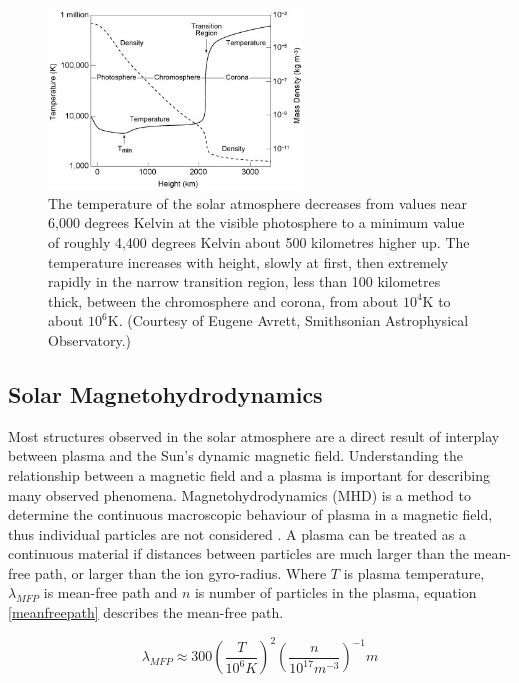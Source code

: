 \begin{figure}[H]
  \begin{center}
    \includegraphics[width=0.6\textwidth]{solar-atm-plot}
\caption{The temperature of the solar atmosphere decreases from values near 6,000 degrees Kelvin at the visible photosphere to a minimum value of roughly 4,400 degrees Kelvin about 500 kilometres higher up. The temperature increases with height, slowly at first, then extremely rapidly in the narrow transition region, less than 100 kilometres thick, between the chromosphere and corona, from about $10^{4}$K to about $10^{6}$K. (Courtesy of Eugene Avrett, Smithsonian Astrophysical Observatory.)}\label{solatm}
  \end{center}
\end{figure}

\subsection{Solar Magnetohydrodynamics}\label{MHD}
Most structures observed in the solar atmosphere are a direct result of interplay between plasma and the Sun's dynamic magnetic field. Understanding the relationship between a magnetic field and a plasma is important for describing many observed phenomena. Magnetohydrodynamics (MHD) is a method to determine the continuous macroscopic behaviour of plasma in a magnetic field, thus individual particles are not considered \citep{1982soma.book.....P}. A plasma can be treated as a continuous material if distances between particles are much larger than the mean-free path, or larger than the ion gyro-radius. Where $T$ is plasma temperature, $\lambda_{MFP}$ is mean-free path and $n$ is number of particles in the plasma, equation \ref{meanfreepath} describes the mean-free path. 

\begin{equation}\label{meanfreepath}
\lambda_{MFP}\approx300(\frac{T}{10^{6}K})^{2}(\frac{n}{10^{17}m^{-3}})^{-1}m
\end{equation}

